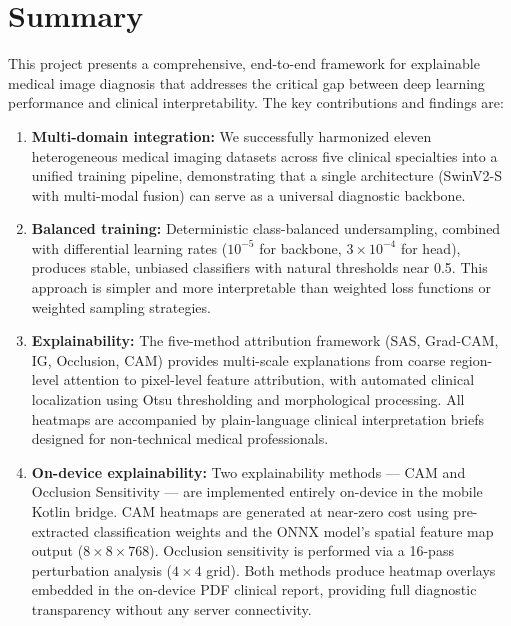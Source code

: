 \documentclass[12pt,a4paper]{report}
\begin{document}
\section{Summary}

This project presents a comprehensive, end-to-end framework for explainable medical image diagnosis that addresses the critical gap between deep learning performance and clinical interpretability. The key contributions and findings are:

\begin{enumerate}
    \item \textbf{Multi-domain integration:} We successfully harmonized eleven heterogeneous medical imaging datasets across five clinical specialties into a unified training pipeline, demonstrating that a single architecture (SwinV2-S with multi-modal fusion) can serve as a universal diagnostic backbone.
    
    \item \textbf{Balanced training:} Deterministic class-balanced undersampling, combined with differential learning rates ($10^{-5}$ for backbone, $3 \times 10^{-4}$ for head), produces stable, unbiased classifiers with natural thresholds near 0.5. This approach is simpler and more interpretable than weighted loss functions or weighted sampling strategies.
    
    \item \textbf{Explainability:} The five-method attribution framework (SAS, Grad-CAM, IG, Occlusion, CAM) provides multi-scale explanations from coarse region-level attention to pixel-level feature attribution, with automated clinical localization using Otsu thresholding and morphological processing. All heatmaps are accompanied by plain-language clinical interpretation briefs designed for non-technical medical professionals.
    
    \item \textbf{On-device explainability:} Two explainability methods --- CAM and Occlusion Sensitivity --- are implemented entirely on-device in the mobile Kotlin bridge. CAM heatmaps are generated at near-zero cost using pre-extracted classification weights and the ONNX model's spatial feature map output ($8 \times 8 \times 768$). Occlusion sensitivity is performed via a 16-pass perturbation analysis ($4 \times 4$ grid). Both methods produce heatmap overlays embedded in the on-device PDF clinical report, providing full diagnostic transparency without any server connectivity.
    

\end{enumerate}
\end{document}
